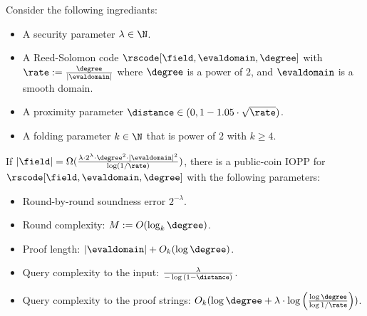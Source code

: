 \begin{theorem}\label{thm:stir}
    Consider the following ingrediants:
    \begin{itemize}
        \item A security parameter $\lambda\in\N$.
        \item A Reed-Solomon code $\rscode[\field,\evaldomain,\degree]$ with $\rate:=\frac{\degree}{|\evaldomain|}$ where $\degree$ is a power of $2$, and $\evaldomain$ is a smooth domain.
        \item A proximity parameter $\distance\in(0,1-1.05\cdot\sqrt{\rate})$.
        \item A folding parameter $k\in\N$ that is power of $2$ with $k\geq 4$.
    \end{itemize}
If $|\field|=\Omega(\frac{\lambda\cdot2^\lambda\cdot\degree^2\cdot{|\evaldomain|}^2}{\log(1/\rate)})$, there is a public-coin IOPP for $\rscode[\field,\evaldomain,\degree]$ with the following parameters:
\begin{itemize}
    \item Round-by-round soundness error $2^{-\lambda}$.
    \item Round complexity: $M:=O(\log_k{\degree})$.
    \item Proof length: $|\evaldomain|+O_k(\log{\degree})$.
    \item Query complexity to the input: $\frac{\lambda}{-\log{(1-\distance)}}$.
    \item Query complexity to the proof strings: $O_k(\log{\degree}+\lambda\cdot\log{\Big(\frac{\log{\degree}}{\log{1/\rate}}\Big)})$.
\end{itemize}
\end{theorem}

